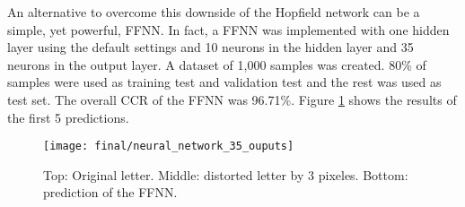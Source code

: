 An alternative to overcome this downside of the Hopfield network can be a simple, yet powerful, FFNN. In fact, a FFNN was implemented with one hidden layer  using the default settings and 10 neurons in the hidden layer and 35 neurons in the output layer. A dataset of 1,000 samples was created. 80\% of samples were used as training test and validation test and the rest was used as test set. The overall CCR of the FFNN was 96.71\%. Figure \ref{neural_network_35_ouputs} shows the results of the first 5 predictions.

\begin{figure}[!htbp]
\caption{Top: Original letter. Middle: distorted letter by 3 pixeles. Bottom: prediction of the FFNN.}
\label{neural_network_35_ouputs}
\texttt{[image: final/neural\_network\_35\_ouputs]}
\centering
\end{figure}


